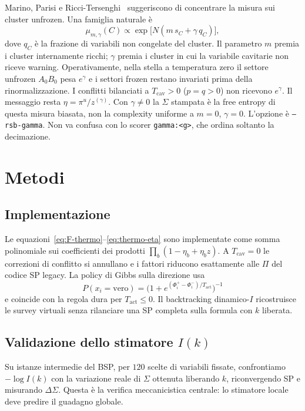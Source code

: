\documentclass{article}
\newcommand{\Sig}{\Sigma}
\newcommand{\Tc}{T_{\mathrm{cav}}}
\newcommand{\Ta}{T_{\mathrm{act}}}
\begin{document}
Marino, Parisi e Ricci-Tersenghi~\cite{marino2016bsp} suggeriscono di concentrare la misura sui cluster unfrozen.
Una famiglia naturale \`e
\begin{equation}
  \mu_{m,\gamma}(C)
  \propto\exp\bigl[N(m\,s_C+\gamma\,q_C)\bigr],
\end{equation}
dove $q_C$ \`e la frazione di variabili non congelate del cluster.
Il parametro $m$ premia i cluster internamente ricchi; $\gamma$ premia i cluster in cui la variabile cavitarie non riceve warning.
Operativamente, nella stella a temperatura zero il settore unfrozen $A_0 B_0$ pesa $e^{\gamma}$ e i settori frozen restano invariati prima della rinormalizzazione.
I conflitti bilanciati a $\Tc>0$ ($p=q>0$) non ricevono $e^{\gamma}$.
Il messaggio resta $\eta=\pi^u/z^{(\gamma)}$.
Con $\gamma\neq 0$ la $\Sig$ stampata \`e la free entropy di questa misura biasata, non la complexity uniforme a $m=0$, $\gamma=0$.
L'opzione \`e \texttt{--rsb-gamma}. Non va confusa con lo scorer \texttt{gamma:<g>}, che ordina soltanto la decimazione.

\section{Metodi}
\label{sec:methods}

\subsection{Implementazione}

Le equazioni~\eqref{eq:F-thermo}--\eqref{eq:thermo-eta} sono implementate come somma polinomiale sui coefficienti dei prodotti $\prod_b(1-\eta_b+\eta_b z)$.
A $\Tc=0$ le correzioni di conflitto si annullano e i fattori riducono esattamente alle $\Pi$ del codice SP legacy.
La policy di Gibbs sulla direzione usa
\begin{equation}
  P(x_i=\mathrm{vero})
  =\bigl(1+e^{(\Phi_i^+-\Phi_i^-)/\Ta}\bigr)^{-1}
\end{equation}
e coincide con la regola dura per $\Ta\le 0$.
Il backtracking dinamico-$I$ ricostruisce le survey virtuali senza rilanciare una SP completa sulla formula con $k$ liberata.

\subsection{Validazione dello stimatore $I(k)$}

Su istanze intermedie del BSP, per $120$ scelte di variabili fissate, confrontiamo $-\log I(k)$ con la variazione reale di $\Sig$ ottenuta liberando $k$, riconvergendo SP e misurando $\Delta\Sig$.
Questa \`e la verifica meccanicistica centrale: lo stimatore locale deve predire il guadagno globale.
\end{document}
